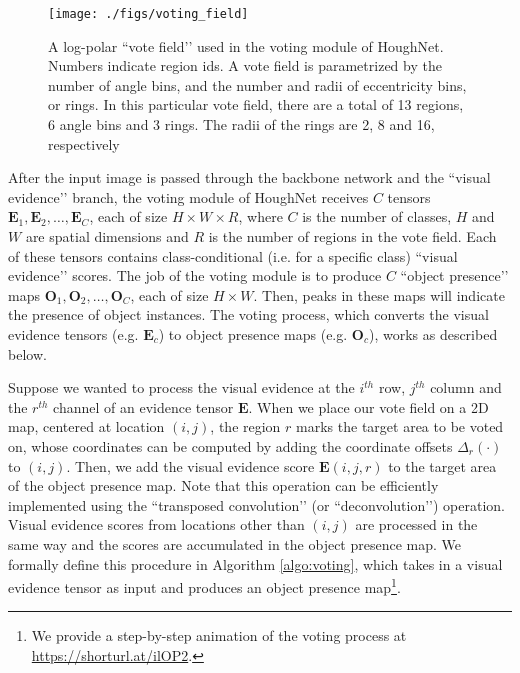 \documentclass[runningheads]{llncs}
\begin{document}
\setlength\intextsep{0pt}
\begin{wrapfigure}[22]{r}{0.4\textwidth}
\texttt{[image: ./figs/voting\_field]}
\centering
\caption{A log-polar ``vote field’’ used in the voting module of HoughNet. Numbers indicate region ids. A vote field is parametrized by the number of angle bins, and the number and radii of eccentricity bins, or rings. In this particular vote field, there are a total of 13 regions, 6 angle bins and 3 rings. The radii of the rings are 2, 8 and 16, respectively
}
\label{fig:vf}
\end{wrapfigure}


After the  input image is passed through the backbone network and the ``visual evidence’’ branch, the voting module of HoughNet receives $C$ tensors $\mathbf{E}_1, \mathbf{E}_2, \dots, \mathbf{E}_C$, each of size  $H\times W\times R$, where $C$ is the number of classes, $H$ and $W$ are spatial dimensions and $R$ is the number of regions in the vote field. Each of these tensors contains class-conditional (i.e. for a specific class) ``visual evidence’’ scores. The job of the voting module is to produce $C$ ``object presence’’ maps $\mathbf{O}_1, \mathbf{O}_2, \dots, \mathbf{O}_C$, each of size $H\times W$. Then, peaks in these maps will indicate the presence of object instances. The voting process, which converts the visual evidence tensors (e.g. $\mathbf{E}_c$) to object presence maps (e.g. $\mathbf{O}_c$), works as described below. 








Suppose we wanted to process the visual evidence at the $i^{th}$ row, $j^{th}$ column and the $r^{th}$ channel of an evidence tensor $\mathbf{E}$. When we place our vote field on a 2D map, centered at location $(i,j)$, the region $r$ marks the target area to be voted on, whose coordinates can be computed by adding the coordinate offsets $\Delta_r(\cdot)$ to $(i,j)$. Then, we add the visual evidence score $\mathbf{E}(i,j,r)$ to the target area of the object presence map. Note that this operation can be efficiently implemented using the ``transposed convolution’’ (or ``deconvolution’’) operation. Visual evidence scores from locations other than $(i,j)$ are processed in the same way and the scores are accumulated in the object presence map. We formally define this procedure in Algorithm \ref{algo:voting}, which takes in a visual evidence tensor as input and produces an object presence map\footnote{We provide a step-by-step animation of the voting process at \url{https://shorturl.at/ilOP2}.}. 
\end{document}
